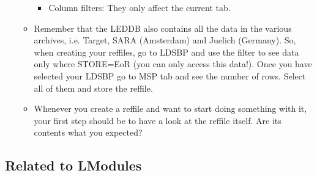 \documentclass[a4paper,11pt]{article}
\begin{document}
\begin{itemize}
\begin{itemize}
\begin{itemize}
\item Column filters: They only affect the current tab.
\end{itemize}	
\item Remember that the LEDDB also contains all the data in the various archives, i.e. Target, SARA (Amsterdam) and Juelich (Germany). 
    So, when creating your reffiles, go to LDSBP and use the filter to see data only where STORE=EoR (you can only access this data!).
    Once you have selected your LDSBP go to MSP tab and see the number of rows. Select all of them and store the reffile.

\item Whenever you create a reffile and want to start doing something with it, your first step should be to have a look at the reffile itself. Are its contents what you expected? 
\end{itemize}
\end{itemize}
\subsection{Related to LModules}
\end{document}
